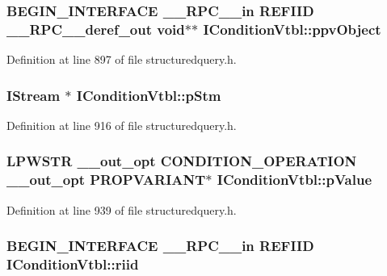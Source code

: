 \subsubsection[{\texorpdfstring{ppv\+Object}{ppvObject}}]{\setlength{\rightskip}{0pt plus 5cm}B\+E\+G\+I\+N\+\_\+\+I\+N\+T\+E\+R\+F\+A\+CE {\bf \+\_\+\+\_\+\+R\+P\+C\+\_\+\+\_\+in} {\bf R\+E\+F\+I\+ID} {\bf \+\_\+\+\_\+\+R\+P\+C\+\_\+\+\_\+deref\+\_\+out} {\bf void}$\ast$$\ast$ I\+Condition\+Vtbl\+::ppv\+Object}\hypertarget{struct_i_condition_vtbl_ab0669152b1eced3f7eff77f1647375f6}{}\label{struct_i_condition_vtbl_ab0669152b1eced3f7eff77f1647375f6}


Definition at line 897 of file structuredquery.\+h.

\subsubsection[{\texorpdfstring{p\+Stm}{pStm}}]{ I\+Stream $\ast$ I\+Condition\+Vtbl\+::p\+Stm}\hypertarget{struct_i_condition_vtbl_a0ce00915c819d82082ff25ade0b6f8de}{}\label{struct_i_condition_vtbl_a0ce00915c819d82082ff25ade0b6f8de}


Definition at line 916 of file structuredquery.\+h.

\subsubsection[{\texorpdfstring{p\+Value}{pValue}}]{ {\bf L\+P\+W\+S\+TR} {\bf \+\_\+\+\_\+out\+\_\+opt} {\bf C\+O\+N\+D\+I\+T\+I\+O\+N\+\_\+\+O\+P\+E\+R\+A\+T\+I\+ON} {\bf \+\_\+\+\_\+out\+\_\+opt} {\bf P\+R\+O\+P\+V\+A\+R\+I\+A\+NT}$\ast$ I\+Condition\+Vtbl\+::p\+Value}\hypertarget{struct_i_condition_vtbl_a3f81a93063c4ba1171fdebbdec5cf118}{}\label{struct_i_condition_vtbl_a3f81a93063c4ba1171fdebbdec5cf118}


Definition at line 939 of file structuredquery.\+h.

\subsubsection[{\texorpdfstring{riid}{riid}}]{\setlength{\rightskip}{0pt plus 5cm}B\+E\+G\+I\+N\+\_\+\+I\+N\+T\+E\+R\+F\+A\+CE {\bf \+\_\+\+\_\+\+R\+P\+C\+\_\+\+\_\+in} {\bf R\+E\+F\+I\+ID} I\+Condition\+Vtbl\+::riid}\hypertarget{struct_i_condition_vtbl_a21a9bcd301e11efa3789f729d31145f5}{}\label{struct_i_condition_vtbl_a21a9bcd301e11efa3789f729d31145f5}


